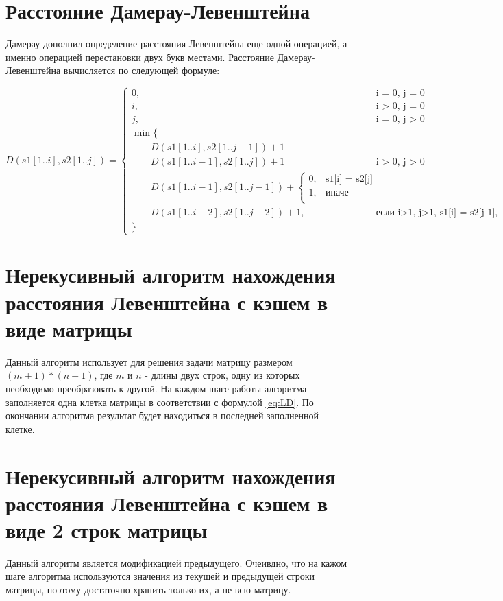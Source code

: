 \documentclass{report}
\begin{document}
\section{Расстояние Дамерау-Левенштейна}

Дамерау дополнил определение расстояния Левенштейна еще одной операцией, а именно операцией перестановки двух букв местами. Расстояние Дамерау-Левенштейна вычисляется по следующей формуле:

\begin{equation}
\label{eq:DLD}
D(s1[1..i], s2[1..j]) = 
\begin{cases}
0,  &\text{i = 0, j = 0}\\
i,  &\text{i > 0, j = 0}\\
j,  &\text{i = 0, j >  0}\\
\min \lbrace \\
\qquad D(s1[1..i], s2[1..j-1]) + 1\\
\qquad D(s1[1..i-1], s2[1..j]) + 1 &\text{i > 0, j > 0}\\
\qquad D(s1[1..i-1], s2[1..j-1]) + 
\begin{cases} 
0, &\text{s1[i] = s2[j]}\\
1, &\text{иначе}\\ 
\end{cases}\\
\qquad D(s1[1..i-2], s2[1..j-2]) + 1, &\text{если i>1, j>1, s1[i] = s2[j-1], s1[i-1] = s2[j]} \\
\rbrace
\end{cases}
\end{equation}

\section{Нерекусивный алгоритм нахождения расстояния Левенштейна с кэшем в виде матрицы}
Данный алгоритм использует для решения задачи матрицу размером $(m + 1) * (n + 1)$, где $m$ и $n$ - длины двух строк, одну из которых необходимо преобразовать к другой. На каждом шаге работы алгоритма заполняется одна клетка матрицы в соответствии с формулой \ref{eq:LD}. По окончании алгоритма результат будет находиться в последней заполненной клетке.

\section{Нерекусивный алгоритм нахождения расстояния Левенштейна с кэшем в виде 2 строк матрицы}
Данный алгоритм является модификацией предыдущего. Очеивдно, что на кажом шаге алгоритма используются значения из текущей и предыдущей строки матрицы, поэтому достаточно хранить только их, а не всю матрицу.
\end{document}
